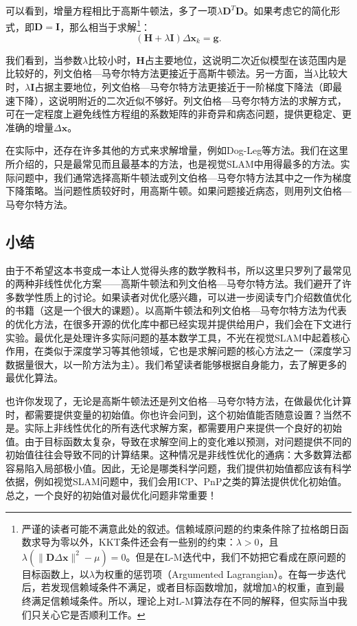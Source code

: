 可以看到，增量方程相比于高斯牛顿法，多了一项$\lambda \bm{D}^T \bm{D}$。如果考虑它的简化形式，即$\bm{D}=\bm{I}$，那么相当于求解\footnote{严谨的读者可能不满意此处的叙述。信赖域原问题的约束条件除了拉格朗日函数求导为零以外，KKT条件还会有一些别的约束：$\lambda>0$，且$\lambda(\|\bm{D} \Delta\bm{x}\|^2-\mu)=0$。但是在L-M迭代中，我们不妨把它看成在原问题的目标函数上，以$\lambda$为权重的惩罚项（Argumented Lagrangian）。在每一步迭代后，若发现信赖域条件不满足，或者目标函数增加，就增加$\lambda$的权重，直到最终满足信赖域条件。所以，理论上对L-M算法存在不同的解释，但实际当中我们只关心它是否顺利工作。}：
\begin{displaymath}
\left( \bm{H} +\lambda \bm{I} \right) \Delta \bm{x}_k = \bm{g}.
\end{displaymath}

我们看到，当参数$\lambda$比较小时，$\bm{H}$占主要地位，这说明二次近似模型在该范围内是比较好的，列文伯格—马夸尔特方法更接近于高斯牛顿法。另一方面，当$\lambda$比较大时，$\lambda \bm{I}$占据主要地位，列文伯格—马夸尔特方法更接近于一阶梯度下降法（即最速下降），这说明附近的二次近似不够好。列文伯格—马夸尔特方法的求解方式，可在一定程度上避免线性方程组的系数矩阵的非奇异和病态问题，提供更稳定、更准确的增量$\Delta \bm{x}$。

在实际中，还存在许多其他的方式来求解增量，例如Dog-Leg\cite{Nocedal2006}等方法。我们在这里所介绍的，只是最常见而且最基本的方法，也是视觉SLAM中用得最多的方法。实际问题中，我们通常选择高斯牛顿法或列文伯格—马夸尔特方法其中之一作为梯度下降策略。当问题性质较好时，用高斯牛顿。如果问题接近病态，则用列文伯格—马夸尔特方法。

\subsection{小结}
由于不希望这本书变成一本让人觉得头疼的数学教科书，所以这里只罗列了最常见的两种非线性优化方案——高斯牛顿法和列文伯格—马夸尔特方法。我们避开了许多数学性质上的讨论。如果读者对优化感兴趣，可以进一步阅读专门介绍数值优化的书籍（这是一个很大的课题）\cite{Nocedal2006}。以高斯牛顿法和列文伯格—马夸尔特方法为代表的优化方法，在很多开源的优化库中都已经实现并提供给用户，我们会在下文进行实验。最优化是处理许多实际问题的基本数学工具，不光在视觉SLAM中起着核心作用，在类似于深度学习等其他领域，它也是求解问题的核心方法之一（深度学习数据量很大，以一阶方法为主）。我们希望读者能够根据自身能力，去了解更多的最优化算法。

也许你发现了，无论是高斯牛顿法还是列文伯格—马夸尔特方法，在做最优化计算时，都需要提供变量的初始值。你也许会问到，这个初始值能否随意设置？当然不是。实际上非线性优化的所有迭代求解方案，都需要用户来提供一个良好的初始值。由于目标函数太复杂，导致在求解空间上的变化难以预测，对问题提供不同的初始值往往会导致不同的计算结果。这种情况是非线性优化的通病：大多数算法都容易陷入局部极小值。因此，无论是哪类科学问题，我们提供初始值都应该有科学依据，例如视觉SLAM问题中，我们会用ICP、PnP之类的算法提供优化初始值。总之，一个良好的初始值对最优化问题非常重要！

